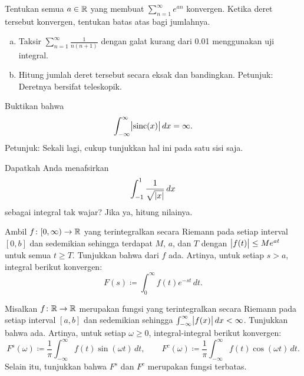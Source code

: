 \begin{exercise}
Tentukan semua $a \in {\mathbb{R}}$ yang membuat $\sum_{n=1}^\infty e^{an}$ konvergen.
Ketika deret tersebut konvergen, tentukan batas atas bagi jumlahnya.
\end{exercise}

\begin{exercise}
\leavevmode
\begin{enumerate}[a)]
\item
Taksir $\sum_{n=1}^\infty \frac{1}{n(n+1)}$ dengan galat kurang dari 0.01
menggunakan uji integral.
\item
Hitung jumlah deret tersebut secara eksak
dan bandingkan.  Petunjuk: Deretnya bersifat teleskopik.
\end{enumerate}
\end{exercise}

\begin{exercise}
Buktikan bahwa
\begin{equation*}
\int_{-\infty}^\infty \bigl\lvert {\operatorname{sinc}(x)} \bigr\rvert\,dx = \infty .
\end{equation*}
Petunjuk: Sekali lagi, cukup tunjukkan hal ini pada satu sisi saja.
\end{exercise}

\begin{exercise}
Dapatkah Anda menafsirkan
\begin{equation*}
\int_{-1}^1 \frac{1}{\sqrt{\lvert {x} \rvert}}\,dx
\end{equation*}
sebagai integral tak wajar?  Jika ya, hitung nilainya.
\end{exercise}

\begin{exercise}
Ambil $f \colon [0,\infty) \to {\mathbb{R}}$ yang terintegralkan secara Riemann pada
setiap interval $[0,b]$ dan sedemikian sehingga terdapat $M$, $a$, dan $T$
dengan $\bigl\lvert {f(t)} \bigr\rvert \leq M e^{at}$ untuk semua $t \geq T$.  Tunjukkan bahwa
\emph{} dari $f$ ada.  Artinya, untuk
setiap $s > a$, integral berikut konvergen:
\begin{equation*}
F(s) \coloneqq \int_{0}^\infty f(t) e^{-st} \,dt .
\end{equation*}
\end{exercise}

\begin{exercise}
Misalkan $f \colon {\mathbb{R}} \to {\mathbb{R}}$ merupakan fungsi yang terintegralkan secara Riemann
pada setiap interval $[a,b]$ dan sedemikian
sehingga $\int_{-\infty}^\infty \bigl\lvert {f(x)} \bigr\rvert\,dx < \infty$.  Tunjukkan bahwa
\emph{}
ada.  Artinya, untuk setiap $\omega \geq 0$,
integral-integral berikut konvergen:
\begin{equation*}
F^s(\omega) \coloneqq \frac{1}{\pi} \int_{-\infty}^\infty f(t) \sin(\omega t) \,dt ,
\qquad
F^c(\omega) \coloneqq \frac{1}{\pi} \int_{-\infty}^\infty f(t) \cos(\omega t) \,dt .
\end{equation*}
Selain itu, tunjukkan bahwa $F^s$ dan $F^c$ merupakan fungsi terbatas.
\end{exercise}

